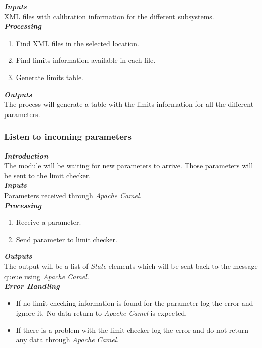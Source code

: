 \textbf{\emph{Inputs}}\\
XML files with calibration information for the different subsystems.\\

\textbf{\emph{Processing}}\\
\begin{enumerate}
\item Find XML files in the selected location.
\item Find limits information available in each file.
\item Generate limits table.
\end{enumerate}
\vspace*{1\baselineskip}
\textbf{\emph{Outputs}}\\
The process will generate a table with the limits information for all the different parameters.\\



\subsubsection{Listen to incoming parameters}

\textbf{\emph{Introduction}}\\
The module will be waiting for new parameters to arrive. Those parameters will be sent to the limit checker.\\

\textbf{\emph{Inputs}}\\
Parameters received through \emph{Apache Camel}.\\

\textbf{\emph{Processing}}\\
\begin{enumerate}
\item Receive a parameter.
\item Send parameter to limit checker.
\end{enumerate}
\vspace*{1\baselineskip}
\textbf{\emph{Outputs}}\\
The output will be a list of \emph{State} elements which will be sent back to the message queue using \emph{Apache Camel}.\\


\textbf{\emph{Error Handling}}\\
\begin{itemize}
\item If no limit checking information is found for the parameter log the error and ignore it. No data return to \emph{Apache Camel} is expected.
\item If there is a problem with the limit checker log the error and do not return any data through \emph{Apache Camel}.
\end{itemize}


